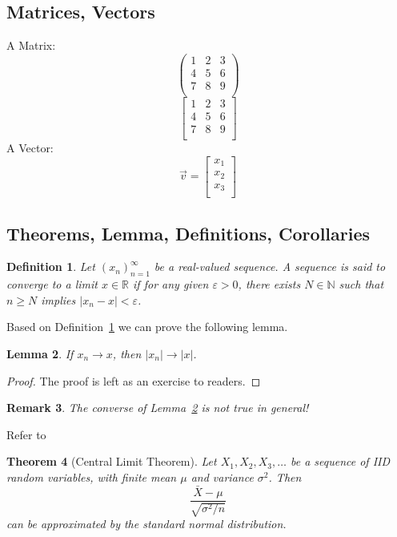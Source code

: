 \documentclass{article}
\newtheorem{definition}{Definition}[section]
\newtheorem{theorem}[definition]{Theorem}
\newtheorem{lemma}[definition]{Lemma}
\newtheorem{remark}[definition]{Remark}
\begin{document}
		\subsection{Matrices, Vectors}
			A Matrix:
			\begin{equation}
				\begin{pmatrix}
					1 & 2 & 3 \\
					4 & 5 & 6 \\
					7 & 8 & 9 \\
				\end{pmatrix}
			\end{equation}
			\begin{equation}
				\begin{bmatrix}
					1 & 2 & 3 \\
					4 & 5 & 6 \\
					7 & 8 & 9 \\
				\end{bmatrix}
			\end{equation}	
			A Vector:
			\begin{equation}
				\vec{v} = 
				\begin{bmatrix}
					x_{1} \\
					x_{2} \\
					x_{3} \\
				\end{bmatrix}
			\end{equation}
		\subsection{Theorems, Lemma, Definitions, Corollaries}
			\begin{definition}\label{convergence}
				Let $(x_{n})_{n=1}^{\infty}$ be a real-valued sequence. A sequence is said to converge to a limit $x \in \mathbb{R}$ if for any given $\varepsilon > 0$, there exists $N \in \mathbb{N}$ such that $n \geq N$ implies $|x_{n} - x| < \varepsilon$.
			\end{definition}
			Based on Definition~\ref{convergence} we can prove the following lemma.
			\begin{lemma}\label{simple lemma}
				If $x_{n} \to x$, then $|x_{n}| \to |x|$.
			\end{lemma}
			\begin{proof}
				The proof is left as an exercise to readers.
			\end{proof}
			\begin{remark}
				The converse of Lemma~\ref{simple lemma} is not true in general!
			\end{remark}
			Refer to \cite{marks-course}
			\begin{theorem}[Central Limit Theorem]
				Let $X_{1}, X_{2}, X_{3}, \dots$ be a sequence of IID random variables, with finite mean $\mu$ and variance $\sigma^{2}$. Then
				\begin{equation}
					\frac{\bar{X}-\mu}{\sqrt{\sigma^{2}/n}}
				\end{equation}
				can be approximated by the standard normal distribution.
			\end{theorem}
\end{document}
